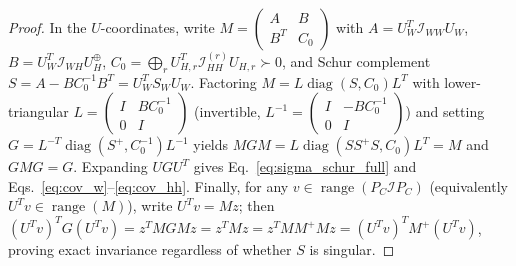 \documentclass[11pt,a4paper]{article}
\theoremstyle{plain}
\theoremstyle{definition}
\theoremstyle{remark}
\newcommand{\cI}{\mathcal{I}}
\newcommand{\diag}{\operatorname{diag}}
\newcommand{\range}{\operatorname{range}}
\newcommand{\pinv}{^{+}}
\begin{document}
\begin{proof}
In the $U$-coordinates, write $M = \begin{pmatrix} A & B \\ B^T & C_0 \end{pmatrix}$ with $A = U_W^T \cI_{WW} U_W$, $B = U_W^T \cI_{WH} U_H^{\oplus}$, $C_0 = \bigoplus_r U_{H,r}^T \cI_{HH}^{(r)} U_{H,r} \succ 0$, and Schur complement $S = A - B C_0^{-1} B^T = U_W^T S_W U_W$. Factoring $M = L \diag(S, C_0) L^T$ with lower-triangular $L = \begin{pmatrix} I & B C_0^{-1} \\ 0 & I \end{pmatrix}$ (invertible, $L^{-1} = \begin{pmatrix} I & -B C_0^{-1} \\ 0 & I \end{pmatrix}$) and setting $G = L^{-T} \diag(S\pinv, C_0^{-1}) L^{-1}$ yields $M G M = L \diag(S S\pinv S, C_0) L^T = M$ and $G M G = G$. Expanding $U G U^T$ gives Eq.~\eqref{eq:sigma_schur_full} and Eqs.~\eqref{eq:cov_w}--\eqref{eq:cov_hh}. Finally, for any $v \in \range(P_C \cI P_C)$ (equivalently $U^T v \in \range(M)$), write $U^T v = M z$; then $(U^T v)^T G (U^T v) = z^T M G M z = z^T M z = z^T M M\pinv M z = (U^T v)^T M\pinv (U^T v)$, proving exact invariance regardless of whether $S$ is singular.
\end{proof}
\end{document}
